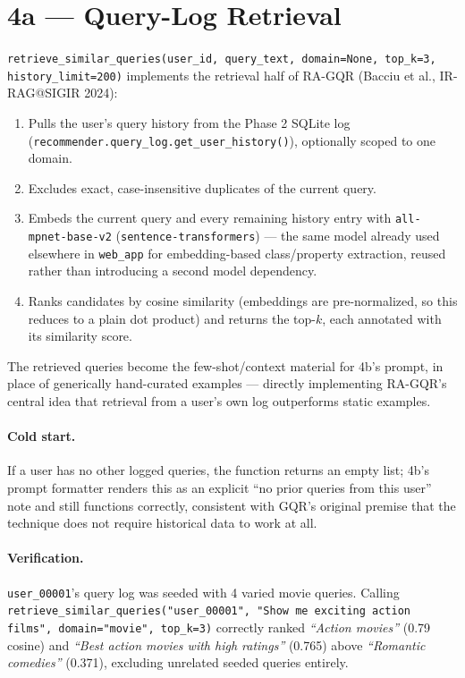\documentclass[11pt,a4paper]{article}
\newcommand{\code}[1]{\texttt{#1}}
\begin{document}
\newpage
\section{4a --- Query-Log Retrieval}

\code{retrieve\_similar\_queries(user\_id, query\_text, domain=None, top\_k=3,
history\_limit=200)} implements the retrieval half of RA-GQR (Bacciu et al., IR-RAG@SIGIR 2024):

\begin{enumerate}
    \item Pulls the user's query history from the Phase 2 SQLite log
        (\code{recommender.query\_log.get\_user\_history()}), optionally scoped to one domain.
    \item Excludes exact, case-insensitive duplicates of the current query.
    \item Embeds the current query and every remaining history entry with \code{all-mpnet-base-v2}
        (\code{sentence-transformers}) --- the same model already used elsewhere in \code{web\_app}
        for embedding-based class/property extraction, reused rather than introducing a second
        model dependency.
    \item Ranks candidates by cosine similarity (embeddings are pre-normalized, so this reduces to
        a plain dot product) and returns the top-$k$, each annotated with its similarity score.
\end{enumerate}

The retrieved queries become the few-shot/context material for 4b's prompt, in place of
generically hand-curated examples --- directly implementing RA-GQR's central idea that retrieval
from a user's own log outperforms static examples.

\paragraph{Cold start.} If a user has no other logged queries, the function returns an empty list;
4b's prompt formatter renders this as an explicit ``no prior queries from this user'' note and
still functions correctly, consistent with GQR's original premise that the technique does not
require historical data to work at all.

\paragraph{Verification.} \code{user\_00001}'s query log was seeded with 4 varied movie queries.
Calling \code{retrieve\_similar\_queries("user\_00001", "Show me exciting action films",
domain="movie", top\_k=3)} correctly ranked \emph{``Action movies''} (0.79 cosine) and \emph{``Best
action movies with high ratings''} (0.765) above \emph{``Romantic comedies''} (0.371), excluding
unrelated seeded queries entirely.
\end{document}

